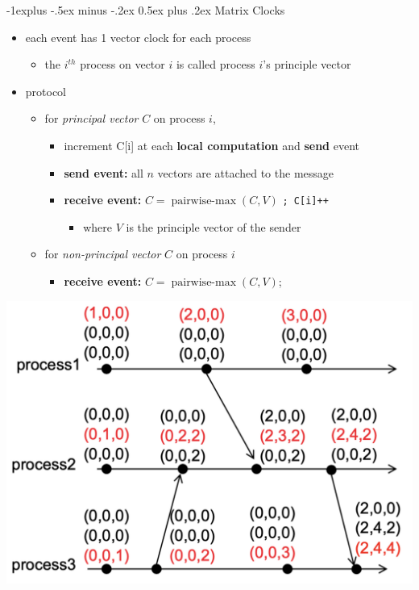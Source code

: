 \documentclass[10pt, landscape]{article}
\makeatletter
\renewcommand{\subsection}{\@startsection{subsection}{2}{0mm}%
  {-1explus -.5ex minus -.2ex}%
  {0.5ex plus .2ex}%
{\normalfont\normalsize\bfseries}}
\DeclareMathOperator{\pairwisemax}{pairwise-max}
\makeatother
\begin{document}
\begin{multicols*}{3}
  \subsection{Matrix Clocks}

  \begin{itemize}
    \item each event has 1 vector clock for each process
      \begin{itemize}
        \item the $i^{th}$ process on vector $i$ is called process $i$’s principle vector
      \end{itemize}
    \item protocol
      \begin{itemize}
        \item for \textit{principal vector} $C$ on process $i$,
          \begin{itemize}
            \item increment C[i] at each \textbf{local computation} and \textbf{send} event
            \item \textbf{send event:} all $n$ vectors are attached to the message
            \item \textbf{receive event:}  $C= \pairwisemax(C,V)$ \texttt{; C[i]++}
              \begin{itemize}
                \item where $V$ is the principle vector of the sender
              \end{itemize}
          \end{itemize}
        \item for \textit{non-principal vector} $C$ on process $i$
          \begin{itemize}
            \item \textbf{receive event:} $C= \pairwisemax(C,V)$;
          \end{itemize}
      \end{itemize}
  \end{itemize}

  \begin{tightcenter}
    \includegraphics[width=0.6\linewidth]{cs4231-matrix-clock.png} 
  \end{tightcenter}


\end{multicols*}
\end{document}
